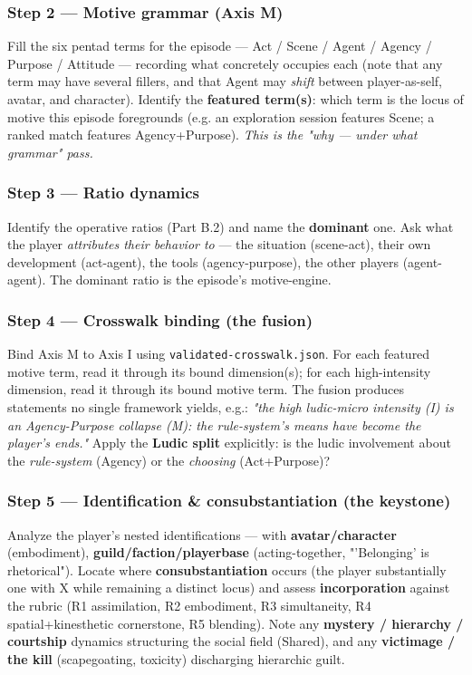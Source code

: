 \documentclass[11pt]{report}
\begin{document}
\subsubsection{Step 2 — Motive grammar (Axis M)}

Fill the six pentad terms for the episode — Act / Scene / Agent / Agency / Purpose / Attitude — recording what concretely occupies each (note that any term may have several fillers, and that Agent may \textit{shift} between player-as-self, avatar, and character). Identify the \textbf{featured term(s)}: which term is the locus of motive this episode foregrounds (e.g. an exploration session features Scene; a ranked match features Agency+Purpose). \textit{This is the "why — under what grammar" pass.}


\subsubsection{Step 3 — Ratio dynamics}

Identify the operative ratios (Part B.2) and name the \textbf{dominant} one. Ask what the player \textit{attributes their behavior to} — the situation (scene-act), their own development (act-agent), the tools (agency-purpose), the other players (agent-agent). The dominant ratio is the episode's motive-engine.


\subsubsection{Step 4 — Crosswalk binding (the fusion)}

Bind Axis M to Axis I using \texttt{validated-\discretionary{}{}{}crosswalk.\discretionary{}{}{}json}. For each featured motive term, read it through its bound dimension(s); for each high-intensity dimension, read it through its bound motive term. The fusion produces statements no single framework yields, e.g.: \textit{"the high ludic-micro intensity (I) is an Agency-Purpose collapse (M): the rule-system's means have become the player's ends."} Apply the \textbf{Ludic split} explicitly: is the ludic involvement about the \textit{rule-system} (Agency) or the \textit{choosing} (Act+Purpose)?


\subsubsection{Step 5 — Identification \& consubstantiation (the keystone)}

Analyze the player's nested identifications — with \textbf{avatar/character} (embodiment), \textbf{guild/faction/playerbase} (acting-together, "'Belonging' is rhetorical"). Locate where \textbf{consubstantiation} occurs (the player substantially one with X while remaining a distinct locus) and assess \textbf{incorporation} against the rubric (R1 assimilation, R2 embodiment, R3 simultaneity, R4 spatial+kinesthetic cornerstone, R5 blending). Note any \textbf{mystery / hierarchy / courtship} dynamics structuring the social field (Shared), and any \textbf{victimage / the kill} (scapegoating, toxicity) discharging hierarchic guilt.
\end{document}
